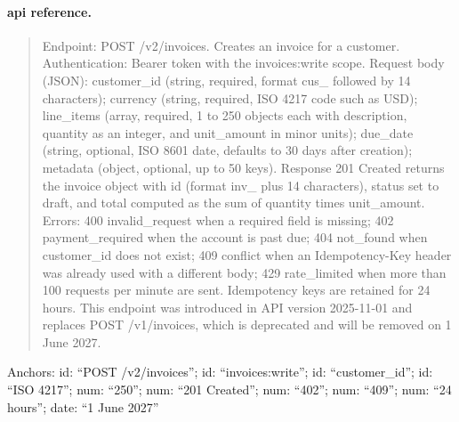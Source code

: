 \paragraph{api reference.}
\begin{quote}\small Endpoint: POST /v2/invoices. Creates an invoice for a customer. Authentication: Bearer token with the invoices:write scope. Request body (JSON): customer\_id (string, required, format cus\_ followed by 14 characters); currency (string, required, ISO 4217 code such as USD); line\_items (array, required, 1 to 250 objects each with description, quantity as an integer, and unit\_amount in minor units); due\_date (string, optional, ISO 8601 date, defaults to 30 days after creation); metadata (object, optional, up to 50 keys). Response 201 Created returns the invoice object with id (format inv\_ plus 14 characters), status set to draft, and total computed as the sum of quantity times unit\_amount. Errors: 400 invalid\_request when a required field is missing; 402 payment\_required when the account is past due; 404 not\_found when customer\_id does not exist; 409 conflict when an Idempotency-Key header was already used with a different body; 429 rate\_limited when more than 100 requests per minute are sent. Idempotency keys are retained for 24 hours. This endpoint was introduced in API version 2025-11-01 and replaces POST /v1/invoices, which is deprecated and will be removed on 1 June 2027.\end{quote}
\noindent\footnotesize Anchors: id: ``POST /v2/invoices''; id: ``invoices:write''; id: ``customer\_id''; id: ``ISO 4217''; num: ``250''; num: ``201 Created''; num: ``402''; num: ``409''; num: ``24 hours''; date: ``1 June 2027''\normalsize

